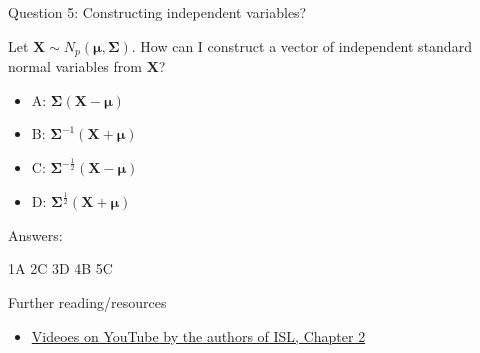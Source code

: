 \documentclass[ignorenonframetext,]{beamer}
\providecommand{\tightlist}{%
  \setlength{\itemsep}{0pt}\setlength{\parskip}{0pt}}
\begin{document}
\begin{frame}

\begin{block}{Question 5: Constructing independent variables?}

\vspace{2mm}

Let \(\boldsymbol{X}\sim N_p(\boldsymbol{\mu},\boldsymbol\Sigma)\). How
can I construct a vector of independent standard normal variables from
\(\boldsymbol{X}\)?

\begin{itemize}
\tightlist
\item
  A: \(\boldsymbol\Sigma(\boldsymbol{X}-\boldsymbol{\mu})\)
\item
  B: \(\boldsymbol\Sigma^{-1}(\boldsymbol{X}+\boldsymbol{\mu})\)
\item
  C:
  \(\boldsymbol\Sigma^{-\frac{1}{2}}(\boldsymbol{X}-\boldsymbol{\mu})\)
\item
  D:
  \(\boldsymbol\Sigma^{\frac{1}{2}}(\boldsymbol{X}+\boldsymbol{\mu})\)
\end{itemize}

\end{block}

\end{frame}

\begin{frame}

\begin{block}{Answers:}

1A 2C 3D 4B 5C

\end{block}

\end{frame}

\begin{frame}{ Further reading/resources}

\begin{itemize}
\tightlist
\item
  \href{https://www.youtube.com/playlist?list=PL5-da3qGB5IDvuFPNoSqheihPOQNJpzyy}{Videoes
  on YouTube by the authors of ISL, Chapter 2}
\end{itemize}

\end{frame}
\end{document}
